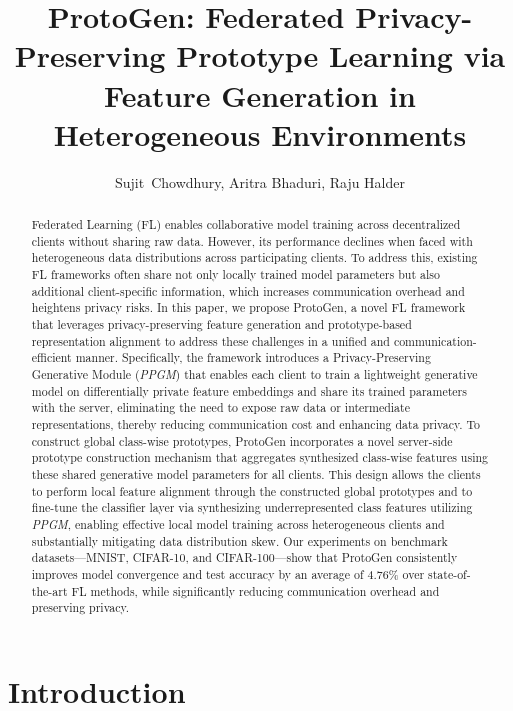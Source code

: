 \documentclass[lettersize,journal]{IEEEtran}
\title{\textsf{ProtoGen}: Federated Privacy-Preserving Prototype Learning via Feature Generation in Heterogeneous Environments}
\author{Sujit~Chowdhury, Aritra Bhaduri, Raju Halder%
\IEEEcompsocitemizethanks{\IEEEcompsocthanksitem Sujit Chowdhury, Aritra Bhaduri, Raju Halder are with the Department
of Computer Science and Engineering, Indian Institute of Technology Patna, 
India, 801106.\protect\\
E-mail: \{sujit\_2021cs35, aritra\_2101ai40, halder\}@iitp.ac.in}
}
\begin{document}
\maketitle

\begin{abstract}
	Federated Learning (FL) enables collaborative model training across decentralized clients without sharing raw data. However, its performance declines when faced with heterogeneous data distributions across participating clients. To address this, existing FL frameworks often share not only locally trained model parameters but also additional client-specific information, which increases communication overhead and heightens privacy risks. In this paper, we propose \textsf{ProtoGen}, a novel FL framework that leverages privacy-preserving feature generation and prototype-based representation alignment to address these challenges in a unified and communication-efficient manner. Specifically, the framework introduces a Privacy-Preserving Generative Module (\emph{PPGM}) that enables each client to train a lightweight generative model on differentially private feature embeddings and share its trained parameters with the server, eliminating the need to expose raw data or intermediate representations, thereby reducing communication cost and enhancing data privacy. To construct global class-wise prototypes, \textsf{ProtoGen} incorporates a novel server-side prototype construction mechanism that aggregates synthesized class-wise features using these shared generative model parameters for all clients. This design allows the clients to perform local feature alignment through the constructed global prototypes and to fine-tune the classifier layer via synthesizing underrepresented class features utilizing \emph{PPGM}, enabling effective local model training across heterogeneous clients and substantially mitigating data distribution skew. Our experiments on benchmark datasets—MNIST, CIFAR-10, and CIFAR-100—show that \textsf{ProtoGen} consistently improves model convergence and test accuracy by an average of 4.76\% over state-of-the-art FL methods, while significantly reducing communication overhead and preserving privacy.
\end{abstract}



\section{Introduction}
\end{document}
